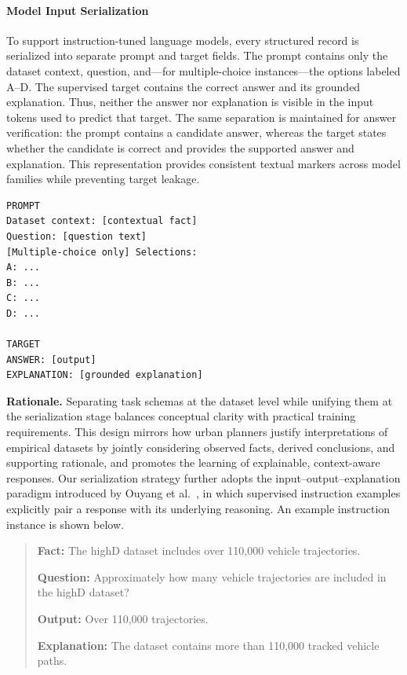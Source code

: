 \documentclass[a4paper,fleqn]{cas-sc}
\begin{document}
\paragraph{Model Input Serialization}
To support instruction-tuned language models, every structured record is serialized into separate prompt and target fields. The prompt contains only the dataset context, question, and---for multiple-choice instances---the options labeled A--D. The supervised target contains the correct answer and its grounded explanation. Thus, neither the answer nor explanation is visible in the input tokens used to predict that target. The same separation is maintained for answer verification: the prompt contains a candidate answer, whereas the target states whether the candidate is correct and provides the supported answer and explanation. This representation provides consistent textual markers across model families while preventing target leakage.
\newpage
\begin{lstlisting}[style=Matlab-editor]
PROMPT
Dataset context: [contextual fact]
Question: [question text]
[Multiple-choice only] Selections:
A: ...
B: ...
C: ...
D: ...

TARGET
ANSWER: [output]
EXPLANATION: [grounded explanation]
\end{lstlisting}

\textbf{Rationale.}
Separating task schemas at the dataset level while unifying them at the serialization stage balances conceptual clarity with practical training requirements. This design mirrors how urban planners justify interpretations of empirical datasets by jointly considering observed facts, derived conclusions, and supporting rationale, and promotes the learning of explainable, context-aware responses. Our serialization strategy further adopts the input–output–explanation paradigm introduced by Ouyang et al.~\cite{ouyang2022training}, in which supervised instruction examples explicitly pair a response with its underlying reasoning.
An example instruction instance is shown below.

\begin{quote}
\small
\noindent\textbf{Fact:} The highD dataset includes over 110,000 vehicle trajectories.

\vspace{0.4em}

\noindent\textbf{Question:} Approximately how many vehicle trajectories are included in the highD dataset?

\vspace{0.4em}

\noindent\textbf{Output:} Over 110,000 trajectories.

\vspace{0.4em}

\noindent\textbf{Explanation:} The dataset contains more than 110,000 tracked vehicle paths.
\end{quote}
\end{document}
